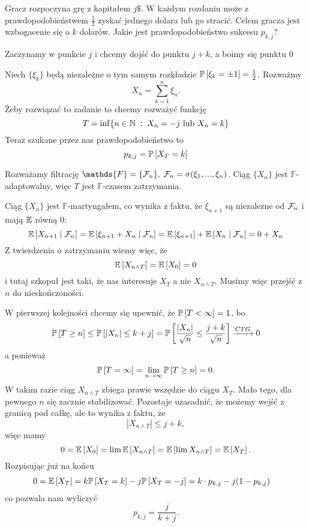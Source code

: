 \begin{example}
  \item Gracz rozpoczyna grę z kapitałem $j\$$. W każdym rozdaniu może z prawdopodobieństwem $\frac{1}{2}$ zyskać jednego dolara lub go stracić. Celem gracza jest wzbogacenie się o $k$ dolarów. Jakie jest prawdopodobieństwo sukcesu $p_{k,j}$?

    Zaczynamy w punkcie $j$ i chcemy dojść do punktu $j+k$, a boimy się punktu $0$

    \begin{center}\end{center}

    Niech $\{\xi_k\}$ będą niezależne o tym samym rozkładzie $\prob{\xi_k=\pm 1}=\frac{1}{2}$. Rozważmy
    $$X_n=\sum_{k=1}^n\xi_n.$$
    Żeby rozwiązać to zadanie to chcemy rozważyć funkcję
    $$T=\inf\{n\in\operatorname{\mathbb{N}}\;:\; X_n=-j\text{ lub }X_n=k\}$$
    Teraz szukane przez nas prawdopodobieństwo to
    $$p_{k,j}=\prob{X_T=k}$$

    Rozważamy filtrację $\mathds{F}=\{\set{F}_n\},\; \set{F}_n=\sigma(\xi_1,...,\xi_n)$. Ciąg $\{X_n\}$ jest $\mathds{F}$-adaptowalny, więc $T$ jest $\mathds{F}$-czasem zatrzymania.

    Ciąg $\{X_n\}$ jest $\mathds{F}$-martyngałem, co wynika z faktu, że $\xi_{n+1}$ są niezależne od $\mathcal{F}_n$ i mają $\expected$ równą $0$:
    $$\expected{X_{n+1}}{\set{F}_n}=\expected{\xi_{n+1}+X_n}{\set{F}_n}=\expected{\xi_{n+1}}+\expected{X_n}{\set{F}_n}=0+X_n$$
    Z twierdzenia o zatrzymaniu wiemy więc, że
    $$\expected{X_{n\land T}}=\expected{X_0}=0$$
    i tutaj szkopuł jest taki, że nas interesuje $X_T$ a nie $X_{n\land T}$. Musimy więc przejść z $n$ do nieskończoności.

    W pierwszej kolejności chcemy się upewnić, że $\prob{T<\infty}=1$, bo 
    $$\prob{T\geq n}\leq \prob{|X_n|\leq k+j}=\prob{\frac{|X_n|}{\sqrt{n}}\leq \frac{j+k}{\sqrt{n}}}\xrightarrow{CTG} 0$$
    a ponieważ
    $$\prob{T=\infty}=\lim_{n\to\infty}\prob{T\geq n}=0.$$
    W takim razie ciąg $X_{n\land T}$ zbiega prawie wszędzie do ciągu $X_T$. Mało tego, dla pewnego $n$ się zacznie stabilizować. Pozostaje uzasadnić, że możemy wejść z granicą pod całkę, ale to wynika z faktu, że
    $$|X_{n\land T}|\leq j+k,$$
    więc mamy
    $$0=\expected{X_0}=\lim \expected{X_{n\land T}}=\expected{\lim X_{n\land T}}=\expected{X_T}.$$
    Rozpisując już na końcu
    \begin{align*}
      0=\expected{X_T}&=k\prob{X_T=k}-j\prob{X_T=-j}=k\cdot p_{k,j}-j(1-p_{k,j})
    \end{align*}
    co pozwala nam wyliczyć
    $$p_{k,j}=\frac{j}{k+j}.$$


\end{example}
